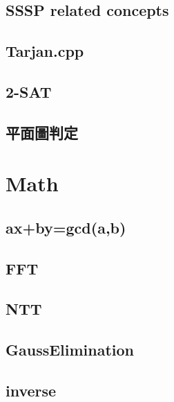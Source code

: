 	\subsection{SSSP related concepts}
		
	\subsection{Tarjan.cpp}
		
	\subsection{2-SAT}
		
	\subsection{平面圖判定}
		


\section{Math}
		
	\subsection{ax+by=gcd(a,b)}
		
%		
	\subsection{FFT}
		
	\subsection{NTT}
		
%		
	\subsection{GaussElimination}
		
	\subsection{inverse}
		
%		
%		
